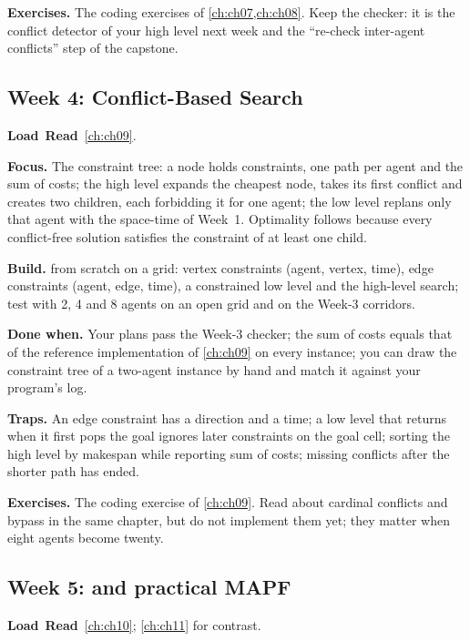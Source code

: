 \textbf{Exercises.} The coding exercises of \cref{ch:ch07,ch:ch08}. Keep the checker: it is
the conflict detector of your \cbs high level next week and the ``re-check inter-agent
conflicts'' step of the capstone.

\subsection{Week 4: Conflict-Based Search}
\label{sec:appA-week04}
\noindent\textbf{Load}\ \quad\textbf{Read}\ \cref{ch:ch09}.

\textbf{Focus.} The constraint tree: a node holds constraints, one path per agent and the sum
of costs; the high level expands the cheapest node, takes its first conflict and creates two
children, each forbidding it for one agent; the low level replans only that agent with the
space-time \astar of Week~1. Optimality follows because every conflict-free solution
satisfies the constraint of at least one child.

\textbf{Build.} \cbs from scratch on a grid: vertex constraints (agent, vertex, time), edge
constraints (agent, edge, time), a constrained low level and the high-level search; test
with 2, 4 and 8 agents on an open grid and on the Week-3 corridors.

\textbf{Done when.} Your plans pass the Week-3 checker; the sum of costs equals that of the
reference implementation of \cref{ch:ch09} on every instance; you can draw the constraint
tree of a two-agent instance by hand and match it against your program's log.

\textbf{Traps.} An edge constraint has a direction and a time; a low level that returns when
it first pops the goal ignores later constraints on the goal cell; sorting the high level by
makespan while reporting sum of costs; missing conflicts after the shorter path has ended.

\textbf{Exercises.} The coding exercise of \cref{ch:ch09}. Read about cardinal conflicts and
bypass in the same chapter, but do not implement them yet; they matter when eight agents
become twenty.

\subsection{Week 5: \ecbs and practical MAPF}
\label{sec:appA-week05}
\noindent\textbf{Load}\ \quad\textbf{Read}\ \cref{ch:ch10}; \cref{ch:ch11}
for contrast.

